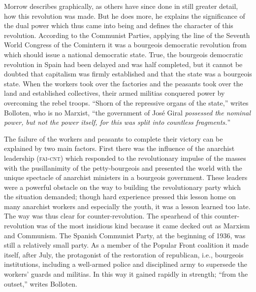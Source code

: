 Morrow describes graphically, as others have since done in still greater detail, how this revolution was made. But he does more, he explains the significance of the dual power which thus came into being and defines the character of this revolution. According to the Communist Parties, applying the line of the Seventh World Congress of the Comintern\label{en:BollotenGrandCamouflageP42} it was a bourgeois democratic revolution from which should issue a national democratic state. True, the bourgeois democratic revolution in Spain had been delayed and was half completed, but it cannot be doubted that capitalism was firmly established and that the state was a bourgeois state. When the workers took over the factories and the peasants took over the land and established collectives, their armed militias conquered power by overcoming the rebel troops. ``Shorn of the repressive organs of the state,'' writes Bolloten{\indexBBolloten}, who is no Marxist, ``the government of Jos\'e Giral{\indexJGiral} \emph{possessed the nominal power, but not the power itself, for this was split into countless fragments.}''\endnotemark[\ref{en:BollotenGrandCamouflageP42}]

The failure of the workers and peasants to complete their victory can be explained by two main factors. First there was the influence of the anarchist leadership (\textsc{fai-cnt}) which responded to the revolutionary impulse of the masses with the pusillanimity of the petty-bourgeois and presented the world with the unique spectacle of anarchist ministers in a bourgeois government. These leaders were a powerful obstacle on the way to building the revolutionary party which the situation demanded; though hard experience pressed this lesson home on many anarchist workers and especially the youth, it was a lesson learned too late. The way was thus clear for counter-revolution. The spearhead of this counter-revolution was of the most insidious kind because it came decked out as Marxism and Communism. The Spanish Communist Party\indexPCE, at the beginning of 1936, was still a relatively small party. As a member of the Popular Front coalition it made itself, after July, the protagonist of the restoration of republican, i.e., bourgeois institutions, including a well-armed police and disciplined army to supersede the workers’ guards and militias. In this way it gained rapidly in strength; ``from the outset,'' writes Bolloten.

